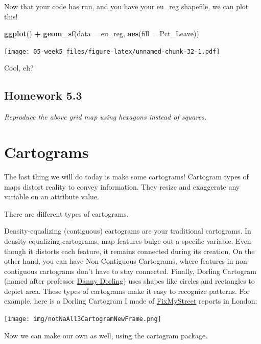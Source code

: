 \documentclass[]{book}
\newenvironment{Shaded}{\begin{snugshade}}{\end{snugshade}}
\newcommand{\DataTypeTok}[1]{\textcolor[rgb]{0.13,0.29,0.53}{#1}}
\newcommand{\KeywordTok}[1]{\textcolor[rgb]{0.13,0.29,0.53}{\textbf{#1}}}
\newcommand{\NormalTok}[1]{#1}
\newcommand{\OperatorTok}[1]{\textcolor[rgb]{0.81,0.36,0.00}{\textbf{#1}}}
\newcommand{\StringTok}[1]{\textcolor[rgb]{0.31,0.60,0.02}{#1}}
\begin{document}
Now that your code has run, and you have your eu\_reg shapefile, we can plot this!

\begin{Shaded}
\begin{Highlighting}[]
\KeywordTok{ggplot}\NormalTok{() }\OperatorTok{+}
\StringTok{  }\KeywordTok{geom_sf}\NormalTok{(}\DataTypeTok{data =}\NormalTok{ eu_reg, }\KeywordTok{aes}\NormalTok{(}\DataTypeTok{fill =}\NormalTok{ Pct_Leave)) }
\end{Highlighting}
\end{Shaded}

\texttt{[image: 05-week5\_files/figure-latex/unnamed-chunk-32-1.pdf]}

Cool, eh?

\hypertarget{homework-5.3}{%
\subsection{Homework 5.3}\label{homework-5.3}}

\emph{Reproduce the above grid map using hexagons instead of squares.}

\hypertarget{cartograms}{%
\section{Cartograms}\label{cartograms}}

The last thing we will do today is make some cartograms! Cartogram types of maps distort reality to convey information. They resize and exaggerate any variable on an attribute value.

There are different types of cartograms.

Density-equalizing (contiguous) cartograms are your traditional cartograms. In density-equalizing cartograms, map features bulge out a specific variable. Even though it distorts each feature, it remains connected during its creation. On the other hand, you can have Non-Contiguous Cartograms, where features in non-contiguous cartograms don't have to stay connected. Finally, Dorling Cartogram (named after professor \href{https://www.geog.ox.ac.uk/staff/ddorling.html}{Danny Dorling}) uses shapes like circles and rectangles to depict area. These types of cartograms make it easy to recognize patterns. For example, here is a Dorling Cartogram I made of \href{www.fixmystreet.org}{FixMyStreet} reports in London:

\texttt{[image: img/notNaAll3CartogramNewFrame.png]}

Now we can make our own as well, using the cartogram package.
\end{document}
